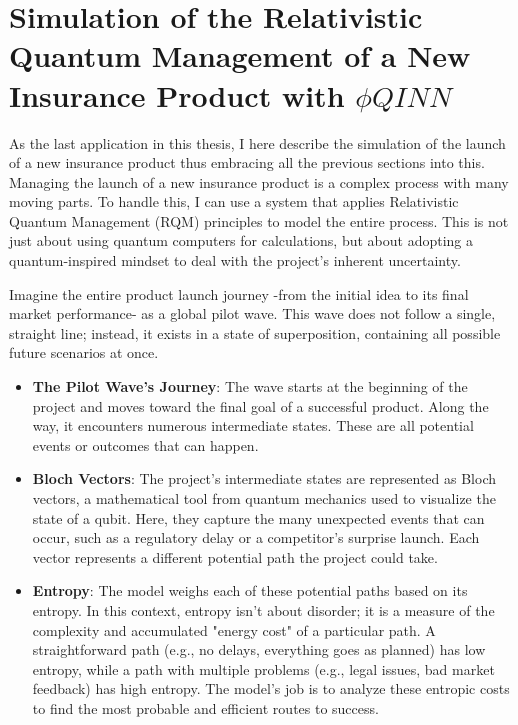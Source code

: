 \documentclass{article}
\begin{document}
\section{Simulation of the Relativistic Quantum Management of a New Insurance Product with $\phi QINN$}
\label{sec9}
As the last application in this thesis, I here describe the simulation of the launch of a new insurance product thus embracing all the previous sections into this.\\
Managing the launch of a new insurance product is a complex process with many moving parts. To handle this, I can use a system that applies Relativistic Quantum Management (RQM) principles to model the entire process. This is not just about using quantum computers for calculations, but about adopting a quantum-inspired mindset to deal with the project's inherent uncertainty.


Imagine the entire product launch journey -from the initial idea to its final market performance- as a global pilot wave. This wave does not follow a single, straight line; instead, it exists in a state of superposition, containing all possible future scenarios at once.
\begin{itemize}
\item \textbf{The Pilot Wave's Journey}: The wave starts at the beginning of the project and moves toward the final goal of a successful product. Along the way, it encounters numerous intermediate states. These are all potential events or outcomes that can happen.
\item \textbf{Bloch Vectors}: The project's intermediate states are represented as Bloch vectors, a mathematical tool from quantum mechanics used to visualize the state of a qubit. Here, they capture the many unexpected events that can occur, such as a regulatory delay or a competitor's surprise launch. Each vector represents a different potential path the project could take.
\item \textbf{Entropy}: The model weighs each of these potential paths based on its entropy. In this context, entropy isn't about disorder; it is a measure of the complexity and accumulated "energy cost" of a particular path. A straightforward path (e.g., no delays, everything goes as planned) has low entropy, while a path with multiple problems (e.g., legal issues, bad market feedback) has high entropy. The model's job is to analyze these entropic costs to find the most probable and efficient routes to success.
\end{itemize}
\end{document}
